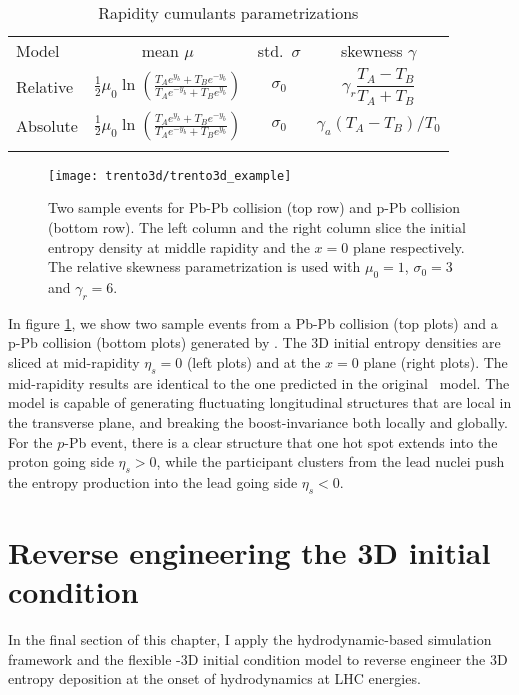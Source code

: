 \begin{table}
\centering
\caption{Rapidity cumulants parametrizations}\label{tab:parametrization}
\begin{tabular}{lccc}
\paddedhline
Model & mean $\mu$ & std.\ $\sigma$ & skewness $\gamma$ \\
\paddedhline \noalign{\smallskip}
Relative  & $\frac{1}{2} \mu_0 \ln\left(\frac{T_A e^{y_b}+T_B e^{-y_b}}{T_A e^{-y_b} + T_B e^{y_b}}\right)$ & $\sigma_0$ & $\gamma_r \dfrac{T_A - T_B}{T_A + T_B}$ \smallskip\\
Absolute & $\frac{1}{2} \mu_0 \ln\left(\frac{T_A e^{y_b}+T_B e^{-y_b}}{T_A e^{-y_b} + T_B e^{y_b}}\right)$  & $\sigma_0$ & $\gamma_a (T_A - T_B)/T_0$\smallskip\\
\paddedhline 
\end{tabular}
\end{table}

\begin{figure}
\singlespacing 
\centering
\texttt{[image: trento3d/trento3d\_example]}
\caption[Two sample events for Pb-Pb collision (top row) and p-Pb]{Two sample events for Pb-Pb collision (top row) and p-Pb collision (bottom row). The left column and the right column slice the initial entropy density at middle rapidity and the $x=0$ plane respectively. The relative skewness parametrization is used with $\mu_0=1$, $\sigma_0=3$ and $\gamma_r=6$.}
\label{fig:3d-example}
\end{figure}

In figure \ref{fig:3d-example}, we show two sample events from a Pb-Pb collision (top plots) and a p-Pb collision (bottom plots) generated by \trento.
The 3D initial entropy densities are sliced at mid-rapidity $\eta_s=0$ (left plots) and at the $x=0$ plane (right plots).
The mid-rapidity results are identical to the one predicted in the original \trento\ model.
The model is capable of generating fluctuating longitudinal structures that are local in the transverse plane, and breaking the boost-invariance both locally and globally.
For the $p$-Pb event, there is a clear structure that one hot spot extends into the proton going side $\eta_s >0$, while the participant clusters from the lead nuclei push the entropy production into the lead going side $\eta_s <0$.

\section{Reverse engineering the 3D initial condition}
In the final section of this chapter, I apply the hydrodynamic-based simulation framework and the flexible \trento-3D initial condition model to reverse engineer the 3D entropy deposition at the onset of hydrodynamics at LHC energies.

